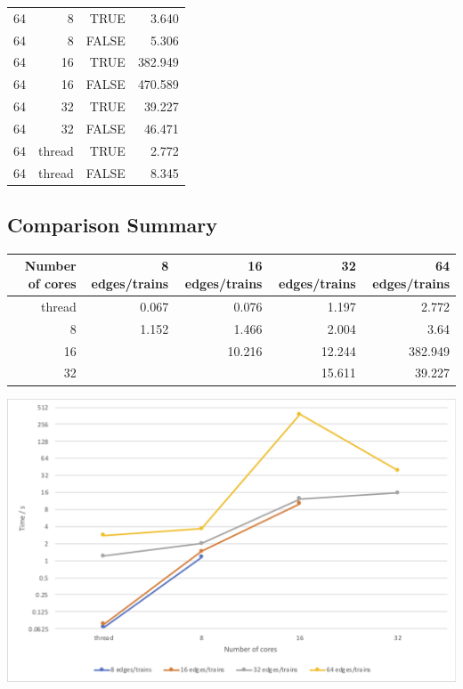 \documentclass[a4paper,12pt]{article}
\begin{document}
\begin{center}
\begin{tabular}{r r r | r}
		\hline
		64                      & 8          & TRUE  & 3.640   \\
		64                      & 8          & FALSE & 5.306   \\
		64                      & 16         & TRUE  & 382.949 \\
		64                      & 16         & FALSE & 470.589 \\
		64                      & 32         & TRUE  & 39.227  \\
		64                      & 32         & FALSE & 46.471  \\
		64                      & thread     & TRUE  & 2.772   \\
		64                      & thread     & FALSE & 8.345   \\
	\end{tabular}
\end{center}

\subsection{Comparison Summary}
\begin{center}
	\begin{tabular}{r | r r r r}
		\textbf{Number of cores} & 8 edges/trains & 16 edges/trains & 32 edges/trains & 64 edges/trains \\ \hline
		thread                   & 0.067          & 0.076           & 1.197           & 2.772           \\ \hline
		8                        & 1.152          & 1.466           & 2.004           & 3.64            \\
		16                       &                & 10.216          & 12.244          & 382.949         \\
		32                       &                &                 & 15.611          & 39.227          \\
	\end{tabular}
\end{center}

\begin{center}
	\includegraphics[width=0.8\linewidth]{comparison-chart}
\end{center}
\end{document}
